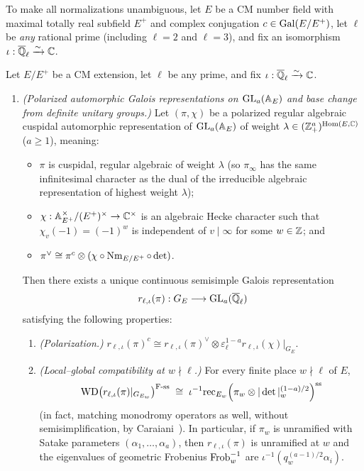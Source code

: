 To make all normalizations unambiguous, let $E$ be a CM number field with maximal totally real subfield $E^+$ and complex conjugation $c \in \mathrm{Gal}(E/E^+)$, let $\ell$ be \emph{any} rational prime (including $\ell = 2$ and $\ell = 3$), and fix an isomorphism $\iota : \overline{\mathbb{Q}}_\ell \xrightarrow{\sim} \mathbb{C}$.

\begin{theorem}
\label{thm:01:classical-automorphic-galois}
Let $E/E^+$ be a CM extension, let $\ell$ be any prime, and fix $\iota : \overline{\mathbb{Q}}_\ell \xrightarrow{\sim} \mathbb{C}$.
\begin{enumerate}[label=\textup{(\Alph*)}]
\item \emph{(Polarized automorphic Galois representations on $\mathrm{GL}_a(\mathbb{A}_E)$ and base change from definite unitary groups.)}
Let $(\pi, \chi)$ be a polarized regular algebraic cuspidal automorphic representation of $\mathrm{GL}_a(\mathbb{A}_E)$ of weight $\lambda \in (\mathbb{Z}^a_+)^{\mathrm{Hom}(E,\mathbb{C})}$ ($a \ge 1$), meaning:
  \begin{itemize}
  \item $\pi$ is cuspidal, regular algebraic of weight $\lambda$ (so $\pi_\infty$ has the same infinitesimal character as the dual of the irreducible algebraic representation of highest weight $\lambda$);
  \item $\chi : \mathbb{A}_{E^+}^\times / (E^+)^\times \to \mathbb{C}^\times$ is an algebraic Hecke character such that $\chi_v(-1) = (-1)^w$ is independent of $v \mid \infty$ for some $w \in \mathbb{Z}$; and
  \item $\pi^\vee \cong \pi^c \otimes (\chi \circ \operatorname{Nm}_{E/E^+} \circ \det)$.
  \end{itemize}
Then there exists a unique continuous semisimple Galois representation
\[
  r_{\ell,\iota}(\pi) : G_E \longrightarrow \mathrm{GL}_a(\overline{\mathbb{Q}}_\ell)
\]
satisfying the following properties:
\begin{enumerate}[label=\textup{(A\arabic*)}]
\item \emph{(Polarization.)} $r_{\ell,\iota}(\pi)^c \cong r_{\ell,\iota}(\pi)^\vee \otimes \varepsilon_\ell^{1-a} r_{\ell,\iota}(\chi)|_{G_E}$.
\item \emph{(Local--global compatibility at $w \nmid \ell$.)} For every finite place $w \nmid \ell$ of $E$,
  \[
    \mathrm{WD}\bigl(r_{\ell,\iota}(\pi)|_{G_{E_w}}\bigr)^{\mathrm{F}\text{-}\mathrm{ss}} \;\cong\; \iota^{-1}\mathrm{rec}_{E_w}\!\left(\pi_w \otimes |\det|_w^{(1-a)/2}\right)^{\mathrm{ss}}
  \]
  (in fact, matching monodromy operators as well, without semisimplification, by Caraiani~\cite{Caraiani2012}). In particular, if $\pi_w$ is unramified with Satake parameters $(\alpha_1, \dots, \alpha_a)$, then $r_{\ell,\iota}(\pi)$ is unramified at $w$ and the eigenvalues of geometric Frobenius $\mathrm{Frob}_w^{-1}$ are $\iota^{-1}(q_w^{(a-1)/2}\alpha_i)$.

\end{enumerate}
\end{enumerate}
\end{theorem}
